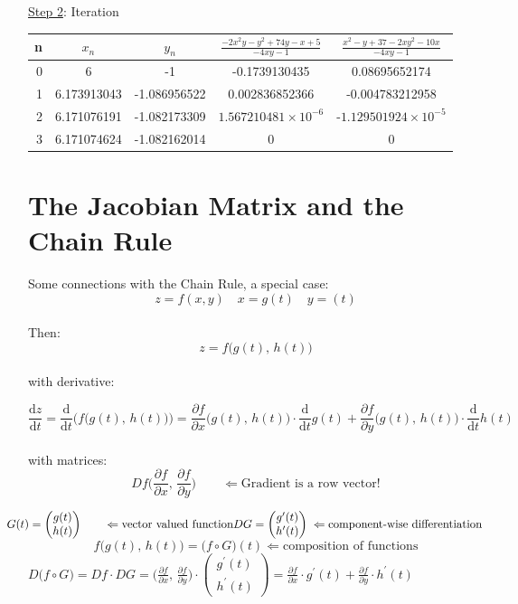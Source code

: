 \documentclass[a4paper,12pt]{report}
\begin{document}
	\vspace{5mm}

	\noindent \underline{Step 2}: Iteration
	\begin{center}
	\small
	\begin{tabular}{r|c|c|c|c}
		n & $x_n$ & $y_n$ & $\frac{-2x^2y-y^2+74y-x+5}{-4xy-1}$ & $\frac{x^2-y+37-2xy^2-10x}{-4xy-1}$\\
		\hline
		0 & 6 & -1 & -0.1739130435 & 0.08695652174 \\
		1 & 6.173913043 & -1.086956522 & 0.002836852366 & -0.004783212958 \\
		2 & 6.171076191 & -1.082173309 & $1.567210481\times 10^{-6}$ & -$1.129501924 \times 10^{-5}$ \\
		3 & 6.171074624 & -1.082162014 & 0 & 0
	\end{tabular}
	\normalsize
	\end{center}
	
	\section{The Jacobian Matrix and the Chain Rule}
	Some connections with the Chain Rule, a special case:
	$$ z=f(x,y) \quad x = g(t) \quad y=(t) $$\\
	Then:
	$$z= f\big( g(t), \, h(t) \big)$$\\
	with derivative:
	
	$$\dfrac{\mathrm{d}z}{\mathrm{d}t}=\dfrac{\mathrm{d}}{\mathrm{d}t} \Big( f\big( g(t), \, h(t) \big) \Big) 
	= \frac{\partial f}{\partial x} \big( g(t), \, h(t) \big) \cdot \dfrac{\mathrm{d}}{\mathrm{d}t} g(t) +
	\frac{\partial f}{\partial y}  \big( g(t), \, h(t) \big) \cdot \dfrac{\mathrm{d}}{\mathrm{d}t} h(t)$$\\
	
	\noindent with matrices:
	$$ Df \big( \frac{\partial f}{\partial x}, \, \frac{\partial f}{\partial y} \big)
	\qquad \Leftarrow\text{Gradient is a row vector!}$$
	\begin{center}
	$\hspace{-7mm} G(t) =
	\begin{pmatrix}
	g(t)\\
	h(t)
	\end{pmatrix}
	\qquad \Leftarrow \text{vector valued function}
	\linebreak
	DG =
	\begin{pmatrix}
		g^\prime (t)\\
		h^\prime (t)
	\end{pmatrix}
	\; \Leftarrow \text{component-wise differentiation}
	$
	$$ f \big( g(t), \, h(t) \big) =  \big( f \circ G \big)(t) \Leftarrow \text{composition of functions}$$
	$ D\big( f \circ G \big) = Df \cdot DG = \big( \frac{\partial f}{\partial x}, \, \frac{\partial f}{\partial y} \big)\cdot
	\begin{pmatrix}
		g^\prime (t)\\
		h^\prime (t)
	\end{pmatrix}
	= \frac{\partial f}{\partial x}\cdot g^\prime (t) + \frac{\partial f}{\partial y}\cdot h^\prime (t)
	$
	\end{center}
	
\end{document}
